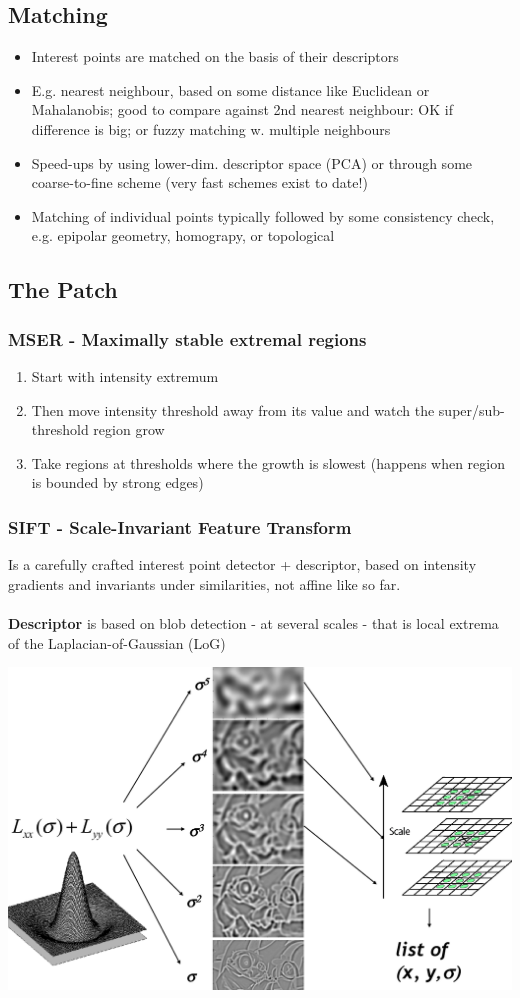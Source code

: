 \subsection{Matching}
\begin{itemize}
	\item Interest points are matched on the basis of their descriptors
	\item E.g. nearest neighbour, based on some distance like Euclidean or Mahalanobis; good to compare against 2nd nearest neighbour: OK if difference is big; or fuzzy matching w. multiple neighbours
	\item Speed-ups by using lower-dim. descriptor space (PCA) or through some coarse-to-fine scheme (very fast schemes exist to date!)
	\item Matching of individual points typically followed by some consistency check, e.g. epipolar geometry, homograpy, or topological
\end{itemize}

\subsection{The Patch}
\subsubsection{MSER - Maximally stable extremal regions}
\begin{enumerate}
	\item Start with intensity extremum
	\item Then move intensity threshold away from its value and watch the super/sub-threshold region grow
	\item Take regions at thresholds where the growth is slowest (happens when region is bounded by strong edges)
\end{enumerate}

\subsubsection{SIFT - Scale-Invariant Feature Transform}
Is a carefully crafted interest point detector + descriptor, based on intensity gradients and invariants under similarities, not affine like so far.\\
\\
\textbf{Descriptor} is based on blob detection - at several scales - that is local extrema of the Laplacian-of-Gaussian (LoG)

\includegraphics[width=0.7\columnwidth]{pictures/sift2}

